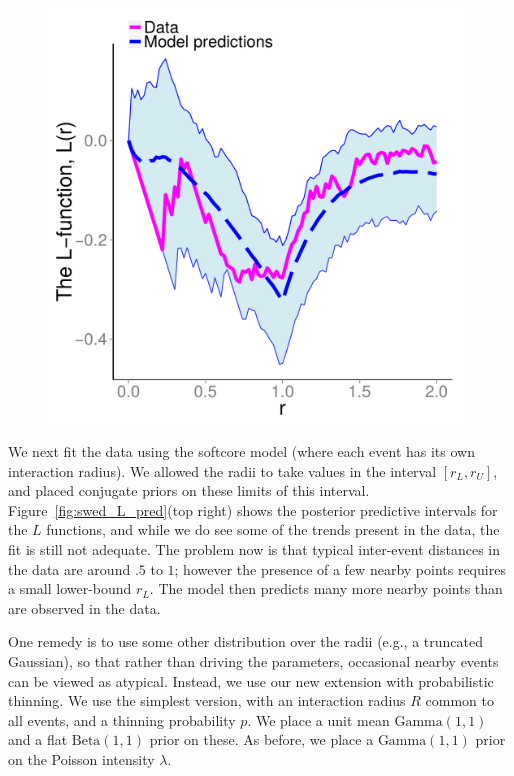 \documentclass{statsoc}
\begin{document}
\begin{figure}
\begin{minipage}[h]{0.6\linewidth}
\begin{minipage}[h]{0.49\linewidth}
  \end{minipage}
  \begin{minipage}[h]{0.49\linewidth}
  \centering
  \includegraphics[width=0.98\textwidth]{figs/Jfunc_postpred_R10/swed_gibbs_Lfunc.pdf}
  \end{minipage}
  \end{minipage}
  \end{figure}
We next fit the data using the softcore model 
(where each \matern event has its own interaction radius). 
We allowed the radii to take values in the interval $[r_L,r_U]$, and placed conjugate priors on these limits of this interval.
Figure~\ref{fig:swed_L_pred}(top right) shows the posterior predictive intervals for the $L$ functions, and while we do see some of the trends present
in the data, the fit is still not adequate. The problem now is that typical inter-event distances in the data are around $.5$ to $1$; however the 
presence of a few nearby points requires a small lower-bound $r_L$. 
The model then predicts many more nearby points than are observed in the data.

One remedy is to use some other distribution over the radii (e.g., a truncated Gaussian),
so that rather than driving the \matern parameters, occasional nearby events can be viewed as atypical.
Instead, we use our new extension with probabilistic thinning. We use the simplest version,
with an interaction radius $R$ common to all \matern events, and a thinning probability $p$.
We place a unit mean $\text{Gamma}(1,1)$ %
and a flat $\text{Beta}(1,1)$ prior on these.
As before, we place a  $\text{Gamma}(1,1)$ prior on the Poisson intensity $\lambda$.
\end{document}
